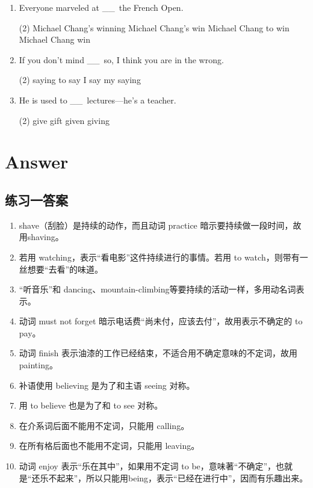\documentclass{yufa}
\newcommand\ttu{ \_\_\ }
\begin{document}
\begin{enumerate}
\item Everyone marveled at \ttu the French Open.
  \begin{tasks}(2)
    \task Michael Chang's winning
    \task Michael Chang's win
    \task Michael Chang to win
    \task Michael Chang win
  \end{tasks}

\item If you don't mind \ttu so, I think you are in the wrong.
  \begin{tasks}(2)
    \task saying
    \task to say
    \task I say
    \task my saying
  \end{tasks}

\item He is used to \ttu lectures—he's a teacher.
  \begin{tasks}(2)
    \task give
    \task gift
    \task given
    \task giving
  \end{tasks}

\end{enumerate}

\section{Answer}
\subsection{练习一答案}
\begin{enumerate}
\item shave（刮脸）是持续的动作，而且动词 practice 暗示要持续做一段时间，故用shaving。
\item 若用 watching，表示“看电影”这件持续进行的事情。若用 to watch，则带有一丝想要“去看”的味道。
\item “听音乐”和 dancing、mountain-climbing等要持续的活动一样，多用动名词表示。
\item 动词 must not forget 暗示电话费“尚未付，应该去付”，故用表示不确定的 to pay。
\item 动词 finish 表示油漆的工作已经结束，不适合用不确定意味的不定词，故用painting。
\item 补语使用 believing 是为了和主语 seeing 对称。
\item 用 to believe 也是为了和 to see 对称。
\item 在介系词后面不能用不定词，只能用 calling。
\item 在所有格后面也不能用不定词，只能用 leaving。
\item 动词 enjoy 表示“乐在其中”，如果用不定词 to be，意味著“不确定”，也就是“还乐不起来”，所以只能用being，表示“已经在进行中”，因而有乐趣出来。
\end{enumerate}
\end{document}
